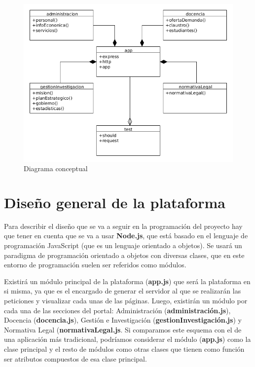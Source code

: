 \begin{figure}[!ht]
  \begin{center}
  \includegraphics[width=1\textwidth]{imagenes/diagrama_conceptual.png}
  \caption{Diagrama conceptual}
  \label{fig:diagrama_conceptual}
  \end{center}
\end{figure}
 
\section{Diseño general de la plataforma}

Para describir el diseño que se va a seguir en la programación del proyecto hay que tener en cuenta que se va a usar 
\textbf{Node.js}, que está basado en el lenguaje de programación JavaScript (que es un lenguaje orientado a objetos). Se usará 
un paradigma de programación orientado a objetos con diversas clases, que en este entorno de programación suelen ser referidos 
como módulos.

\bigskip
Existirá un módulo principal de la plataforma (\textbf{app.js}) que será la plataforma en si misma, ya que es el encargado
de generar el servidor al que se realizarán las peticiones y visualizar cada unas de las páginas. Luego, existirán un módulo
por cada una de las secciones del portal: Administración (\textbf{administración.js}), Docencia (\textbf{docencia.js}), Gestión
e Investigación (\textbf{gestionInvestigación.js}) y Normativa Legal (\textbf{normativaLegal.js}. Si comparamos este esquema
con el de una aplicación más tradicional, podríamos considerar el módulo (\textbf{app.js}) como la clase principal y el resto
de módulos como otras clases que tienen como función ser atributos compuestos de esa clase principal.

